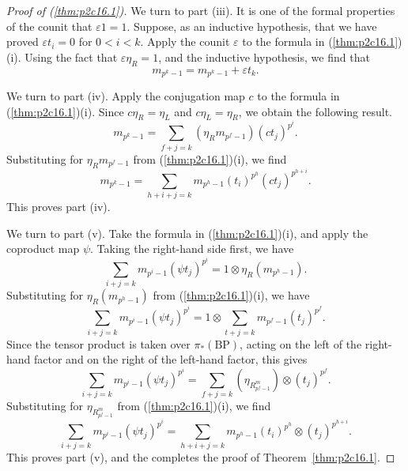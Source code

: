 \documentclass[../main]{subfiles}
\begin{document}
\begin{proof}[Proof of (\ref{thm:p2c16.1})]
We turn to part (iii). It is one of the formal properties of the counit that $\varepsilon 1 = 1$. Suppose, as an inductive hypothesis, that we have proved $\varepsilon t_i = 0$ for $0 < i < k$. Apply the counit $\varepsilon$ to the formula in (\ref{thm:p2c16.1})(i). Using the fact that $\varepsilon \eta_R = 1$, and the inductive hypothesis, we find that $$m_{p^k - 1} = m_{p^k - 1} + \varepsilon t_k.$$ 

We turn to part (iv). Apply the conjugation map $c$ to the formula in (\ref{thm:p2c16.1})(i). Since $c \eta_R = \eta_L$ and $c \eta_L = \eta_R$, we obtain the following result. $$m_{p^k - 1} = \sum_{f + j = k} (\eta_R m_{p^f - 1}) (ct_j)^{p^i}.$$ Substituting for $\eta_R m_{p^f - 1}$ from (\ref{thm:p2c16.1})(i), we find $$m_{p^k - 1} = \sum_{h + i + j = k} m_{p^h - 1} (t_i)^{p^h} (ct_j)^{p^{h + i}}.$$ This proves part (iv).

We turn to part (v). Take the formula in (\ref{thm:p2c16.1})(i), and apply the coproduct map $\psi$. Taking the right-hand side first, we have $$\sum_{i + j = k} m_{p^i - 1} (\psi t_j)^{p^i} = 1 \otimes \eta_R (m_{p^h - 1}).$$ Substituting for $\eta_R(m_{p^h - 1})$ from (\ref{thm:p2c16.1})(i), we have $$\sum_{i + j = k} m_{p^i - 1} (\psi t_j)^{p^i} = 1 \otimes \sum_{t + j = k} m_{p^f - 1} (t_j)^{p^f}.$$ Since the tensor product is taken over $\pi_\ast(\mathrm {BP})$, acting on the left of the right-hand factor and on the right of the left-hand factor, this gives $$\sum_{i + j = k} m_{p^i - 1} (\psi t_j)^{p^i} = \sum_{f + j = k} (\eta_{R^m_{p^f - 1}}) \otimes (t_j)^{p^f}.$$ Substituting for $\eta_{R^m_{p^f - 1}}$ from (\ref{thm:p2c16.1})(i), we find $$\sum_{i + j = k} m_{p^i - 1} (\psi t_j)^{p^i} = \sum_{h + i + j = k} m_{p^h - 1} (t_i)^{p^h} \otimes (t_j)^{p^{h + i}}.$$ This proves part (v), and the completes the proof of Theorem~\ref{thm:p2c16.1}.
\end{proof}
\end{document}
